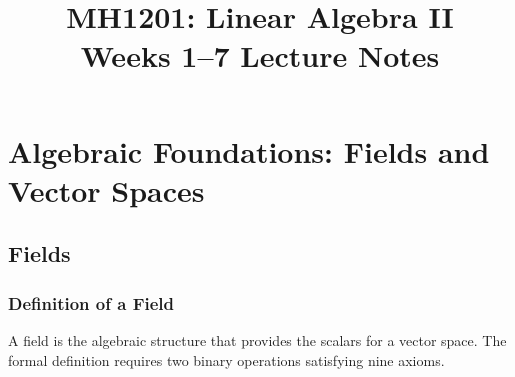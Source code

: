 \documentclass[11pt, a4paper, notitlepage]{report}
\title{\textbf{MH1201: Linear Algebra II}\\[0.5em]
       \large Weeks 1--7 Lecture Notes}
\author{}
\date{}
\makeatletter
\theoremstyle{definition}
\theoremstyle{remark}
\renewcommand\tableofcontents{%
  \section*{\contentsname}%
  \@starttoc{toc}%
}
\makeatother
\begin{document}
\maketitle
\tableofcontents
\newpage

\chapter{Algebraic Foundations: Fields and Vector Spaces}
\label{chap:week1}

\section{Fields}
\label{sec:fields}

\subsection{Definition of a Field}

A field is the algebraic structure that provides the scalars for a vector space. The formal definition requires two binary operations satisfying nine axioms.
\end{document}
